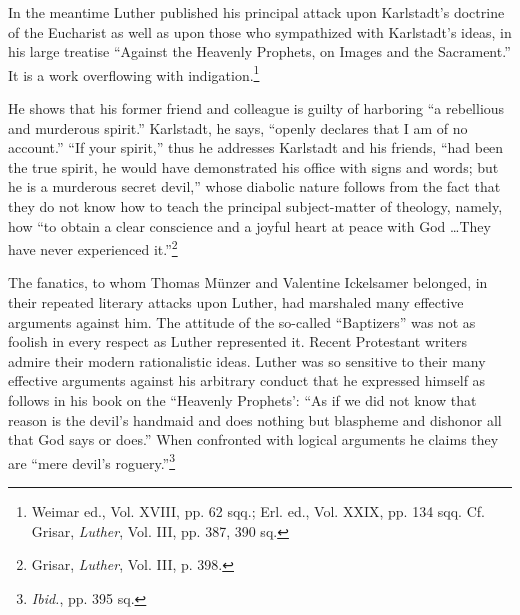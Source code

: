 In the meantime Luther published his principal attack upon Karlstadt’s
doctrine of the Eucharist as well as upon those who sympathized
with Karlstadt’s ideas, in his large treatise “Against the
Heavenly Prophets, on Images and the Sacrament.” It is a work
overflowing with indigation.\footnote{Weimar ed., Vol. XVIII, pp. 62 sqq.; Erl. ed., Vol. XXIX, pp. 134 sqq. Cf. Grisar,
\textit{Luther}, Vol. III, pp. 387, 390 sq.}

He shows that his former friend and colleague is guilty of harboring “a
rebellious and murderous spirit.” Karlstadt, he says, “openly declares that
I am of no account.” “If your spirit,” thus he addresses Karlstadt and his
friends, “had been the true spirit, he would have demonstrated his office
with signs and words; but he is a murderous secret devil,” whose diabolic
nature follows from the fact that they do not know how to teach the principal
subject-matter of theology, namely, how “to obtain a clear conscience
and a joyful heart at peace with God \dots They have never experienced it.”\footnote
{Grisar, \textit{Luther}, Vol. III, p. 398.}

The fanatics, to whom Thomas Münzer and Valentine Ickelsamer belonged,
in their repeated literary attacks upon Luther, had marshaled
many effective arguments against him. The attitude of the so-called “Baptizers”
was not as foolish in every respect as Luther represented it. Recent
Protestant writers admire their modern rationalistic ideas. Luther was so
sensitive to their many effective arguments against his arbitrary conduct
that he expressed himself as follows in his book on the “Heavenly Prophets’:
“As if we did not know that reason is the devil’s handmaid and does nothing
but blaspheme and dishonor all that God says or does.” When confronted
with logical arguments he claims they are “mere devil’s roguery.”\footnote{\textit{Ibid.}, pp. 395 sq.}

